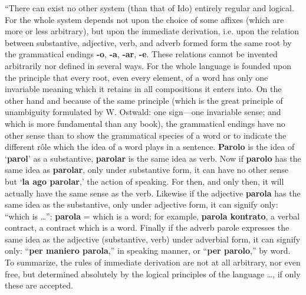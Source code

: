 ``There can exist no other system (than that of Ido) entirely regular and logical. For the whole system depends not upon the choice of some affixes (which are more or less arbitrary), but upon the immediate derivation, i.e. upon the relation between substantive, adjective, verb, and adverb formed form the same root by the grammatical endings \textbf{-o}, \textbf{-a}, \textbf{-ar}, \textbf{-e}. These relations cannot be invented arbitrarily nor defined in several ways. For the whole language is founded upon the principle that every root, even every element, of a word has only one invariable meaning which it retains in all compositions it enters into. On the other hand and because of the same principle (which is the great principle of unambiguity formulated by W. Ostwald: one sign—one invariable sense; and which is more fundamental than any book), the grammatical endings have no other sense than to show the grammatical species of a word or to indicate the different rôle which the idea of a word plays in a sentence. \textbf{Parolo} is the idea of `\textbf{parol}' as a substantive, \textbf{parolar} is the same idea as verb. Now if \textbf{parolo} has the same idea as \textbf{parolar}, only under substantive form, it can have no other sense but `\textbf{la ago parolar},' the action of speaking. For then, and only then, it will actually have the same sense as the verb. Likewise if the adjective \textbf{parola} has the same idea as the substantive, only under adjective form, it can signify only: ``which is \ldots'': \textbf{parola} = which is a word; for example, \textbf{parola kontrato}, a verbal contract, a contract which is a word. Finally if the adverb parole expresses the same idea as the adjective (substantive, verb) under adverbial form, it can signify only: ``\textbf{per maniero parola},'' in speaking manner, or ``\textbf{per parolo},'' by word. To summarize, the rules of immediate derivation are not at all arbitrary, nor even free, but determined absolutely by the logical principles of the language \ldots, if only these are accepted.

